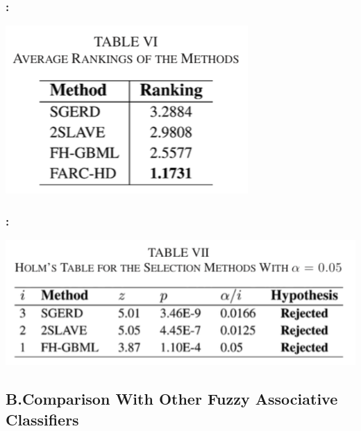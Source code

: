 \documentclass{beamer}
\begin{document}
\begin{CJK*}{UTF8}{bsmi}
\begin{frame}
	\frametitle{\insertsection : \insertsubsection}
	\begin{center}
		\includegraphics[width=1\textheight]{./14.png}
	\end{center}
\end{frame}


\begin{frame}
	\frametitle{\insertsection : \insertsubsection}
	\begin{center}
		\includegraphics[width=1\textheight]{./15.png}
	\end{center}
\end{frame}


\subsection{B.Comparison With Other Fuzzy Associative Classifiers}



\end{CJK*}
\end{document}
